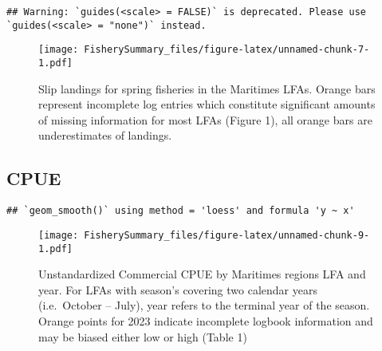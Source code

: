 \documentclass[
]{article}
\begin{document}
\begin{verbatim}
## Warning: `guides(<scale> = FALSE)` is deprecated. Please use `guides(<scale> = "none")` instead.
\end{verbatim}

\begin{figure}
\centering
\texttt{[image: FisherySummary\_files/figure-latex/unnamed-chunk-7-1.pdf]}
\caption{Slip landings for spring fisheries in the Maritimes LFAs.
Orange bars represent incomplete log entries which constitute
significant amounts of missing information for most LFAs (Figure 1), all
orange bars are underestimates of landings.}
\end{figure}

\newpage

\hypertarget{cpue}{%
\subsection{CPUE}\label{cpue}}

\begin{verbatim}
## `geom_smooth()` using method = 'loess' and formula 'y ~ x'
\end{verbatim}

\begin{figure}
\centering
\texttt{[image: FisherySummary\_files/figure-latex/unnamed-chunk-9-1.pdf]}
\caption{Unstandardized Commercial CPUE by Maritimes regions LFA and
year. For LFAs with season's covering two calendar years (i.e.~October
-- July), year refers to the terminal year of the season. Orange points
for 2023 indicate incomplete logbook information and may be biased
either low or high (Table 1)}
\end{figure}

\newpage
\end{document}
